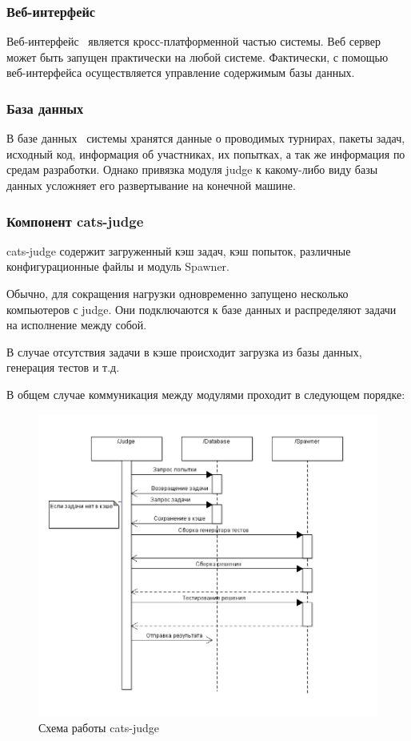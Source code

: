 \documentclass{imcs}
\begin{document}
\FloatBarrier

\subsubsection{Веб-интерфейс}
Веб-интерфейс~\cite{rozhkov} является кросс-платформенной частью системы. Веб сервер может быть запущен практически на любой системе.
Фактически, с помощью веб-интерфейса осуществляется управление содержимым базы данных.

\subsubsection{База данных}
\FloatBarrier
В базе данных~\cite{rozhkov} системы хранятся данные о проводимых турнирах, пакеты задач, исходный код, информация об участниках, их попытках, а так же информация по средам разработки.
Однако привязка модуля judge к какому-либо виду базы данных усложняет его развертывание на конечной машине.

\FloatBarrier
\subsubsection{Компонент cats-judge}
\FloatBarrier
cats-judge\cite{rozhkov} содержит загруженный кэш задач, кэш попыток, различные конфигурационные файлы и модуль Spawner.

Обычно, для сокращения нагрузки одновременно запущено несколько компьютеров с judge. Они подключаются к базе данных и распределяют задачи на исполнение между собой.

\FloatBarrier
В случае отсутствия задачи в кэше происходит загрузка из базы данных, генерация тестов и т.д.

В общем случае коммуникация между модулями проходит в следующем порядке:

\FloatBarrier
\begin{figure}[htb]
\centering
\includegraphics{./img/judgeinteraction.png}
\caption{Схема работы cats-judge}
\label{judgeinteraction}
\end{figure}
\end{document}
